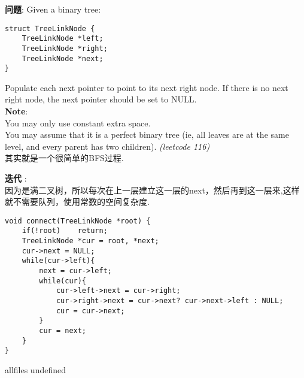 \documentclass{article}
\begin{document}
\begin{CJK}{UTF8}{gbsn}     %

\else
    
\begin{description}
    \item{\textbf{问题}}: Given a binary tree:
    \begin{lstlisting}
struct TreeLinkNode {
    TreeLinkNode *left;
    TreeLinkNode *right;
    TreeLinkNode *next;
}
    \end{lstlisting}
    Populate each next pointer to point to its next right node. If there is no next right node, the next pointer should be set to NULL. 
    \\\textbf{Note}:
    \\You may only use constant extra space.
    \\You may assume that it is a perfect binary tree (ie, all leaves are at the same level, and every parent has two children).
    \textit{(leetcode 116)}
    \\其实就是一个很简单的BFS过程.
    \item{\textbf{迭代}} : 
    \\因为是满二叉树，所以每次在上一层建立这一层的next，然后再到这一层来,这样就不需要队列，使用常数的空间复杂度.
    \begin{lstlisting}
void connect(TreeLinkNode *root) {
    if(!root)    return;
    TreeLinkNode *cur = root, *next;
    cur->next = NULL;
    while(cur->left){
        next = cur->left;
        while(cur){
            cur->left->next = cur->right;
            cur->right->next = cur->next? cur->next->left : NULL;
            cur = cur->next;
        }
        cur = next;
    }
}
    \end{lstlisting}
\end{description}

\fi

\ifx allfiles undefined
\end{CJK}
\end{document}
